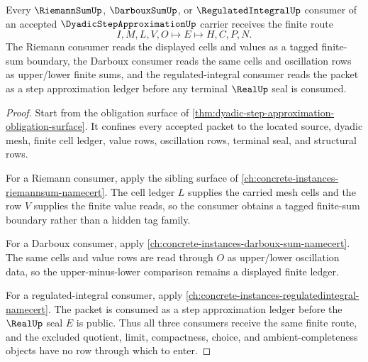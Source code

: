 \begin{theorem}
\label{thm:dyadic-step-approximation-integration-handoff}
Every $\RiemannSumUp$, $\DarbouxSumUp$, or $\RegulatedIntegralUp$ consumer of an accepted $\DyadicStepApproximationUp$ carrier receives the finite route
$$
I,M,L,V,O \longmapsto E \longmapsto H,C,P,N .
$$
The Riemann consumer reads the displayed cells and values as a tagged finite-sum boundary, the Darboux consumer reads the same cells and oscillation rows as upper/lower finite sums, and the regulated-integral consumer reads the packet as a step approximation ledger before any terminal $\RealUp$ seal is consumed.
\end{theorem}
\begin{proof}
Start from the obligation surface of \autoref{thm:dyadic-step-approximation-obligation-surface}. It confines every accepted packet to the located source, dyadic mesh, finite cell ledger, value rows, oscillation rows, terminal seal, and structural rows.

For a Riemann consumer, apply the sibling surface of \autoref{ch:concrete-instances-riemannsum-namecert}. The cell ledger $L$ supplies the carried mesh cells and the row $V$ supplies the finite value reads, so the consumer obtains a tagged finite-sum boundary rather than a hidden tag family.

For a Darboux consumer, apply \autoref{ch:concrete-instances-darboux-sum-namecert}. The same cells and value rows are read through $O$ as upper/lower oscillation data, so the upper-minus-lower comparison remains a displayed finite ledger.

For a regulated-integral consumer, apply \autoref{ch:concrete-instances-regulatedintegral-namecert}. The packet is consumed as a step approximation ledger before the $\RealUp$ seal $E$ is public. Thus all three consumers receive the same finite route, and the excluded quotient, limit, compactness, choice, and ambient-completeness objects have no row through which to enter.
\end{proof}


